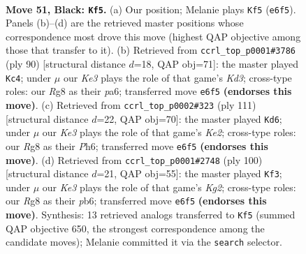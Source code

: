\documentclass[11pt]{article}
\begin{document}
\clearpage

\begin{figure}[p]\centering
\begin{subfigure}{0.46\textwidth}\centering
\resizebox{\linewidth}{!}{%
\newchessgame
\chessboard[
  setfen={6r1/8/Q3kp2/3p4/4qP2/p5P1/P6P/6K1 b - - 22 51},
  showmover=false,
  pgfstyle=straightmove, color=movearrow, markmove={e6-f5}
]}
\caption{}
\end{subfigure}\hfill
\begin{subfigure}{0.46\textwidth}\centering
\resizebox{\linewidth}{!}{%
\newchessgame
\chessboard[
  setfen={1k6/1p5p/p5pP/P7/1P2Q3/2PK3q/8/8 w - - 5 46},
  showmover=false,
  pgfstyle=straightmove, color=movearrow, markmove={d3-c4}
]}
\caption{}
\end{subfigure}
\\[4pt]
\begin{subfigure}{0.46\textwidth}\centering
\resizebox{\linewidth}{!}{%
\newchessgame
\chessboard[
  setfen={8/Q3k3/1p2p2p/1P3p2/2Pq4/6P1/5P2/6K1 b - - 3 56},
  showmover=false,
  pgfstyle=straightmove, color=movearrow, markmove={e7-d6}
]}
\caption{}
\end{subfigure}\hfill
\begin{subfigure}{0.46\textwidth}\centering
\resizebox{\linewidth}{!}{%
\newchessgame
\chessboard[
  setfen={7k/6p1/1pQ4p/p6P/P7/4P1P1/3q2K1/8 w - - 1 51},
  showmover=false,
  pgfstyle=straightmove, color=movearrow, markmove={g2-f3}
]}
\caption{}
\end{subfigure}
\caption{\textbf{Move 51, Black: \texttt{Kf5}.} (a) Our position; Melanie plays \texttt{Kf5} (\texttt{e6f5}). Panels (b)--(d) are the retrieved master positions whose correspondence most drove this move (highest QAP objective among those that transfer to it). (b) Retrieved from \texttt{ccrl\_top\_p0001\#3786} (ply 90) [structural distance $d$=18, QAP obj=71]: the master played \texttt{Kc4}; under $\mu$ our \emph{Ke3} plays the role of that game's \emph{Kd3}; cross-type roles: our \emph{R}g8 as their \emph{p}a6; transferred move \texttt{e6f5} \textbf{(endorses this move)}. (c) Retrieved from \texttt{ccrl\_top\_p0002\#323} (ply 111) [structural distance $d$=22, QAP obj=70]: the master played \texttt{Kd6}; under $\mu$ our \emph{Ke3} plays the role of that game's \emph{Ke2}; cross-type roles: our \emph{R}g8 as their \emph{P}h6; transferred move \texttt{e6f5} \textbf{(endorses this move)}. (d) Retrieved from \texttt{ccrl\_top\_p0001\#2748} (ply 100) [structural distance $d$=21, QAP obj=55]: the master played \texttt{Kf3}; under $\mu$ our \emph{Ke3} plays the role of that game's \emph{Kg2}; cross-type roles: our \emph{R}g8 as their \emph{p}b6; transferred move \texttt{e6f5} \textbf{(endorses this move)}. Synthesis: 13 retrieved analogs transferred to \texttt{Kf5} (summed QAP objective 650, the strongest correspondence among the candidate moves); Melanie committed it via the \texttt{search} selector.}
\label{fig:thought-m101}
\end{figure}
\end{document}

